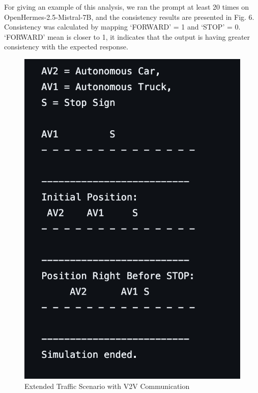 \documentclass[conference]{IEEEtran}
\begin{document}
For giving an example of this analysis, we ran the prompt at least 20 times on OpenHermes-2.5-Mistral-7B, and the consistency results are presented in Fig. 6. Consistency was calculated by mapping `FORWARD' = 1 and `STOP' = 0. `FORWARD' mean is closer to 1, it indicates that the output is having greater consistency with the expected response.

 \begin{figure}[h]
     \centering
     \includegraphics[width=.9\linewidth]{Fig/Communication_agent.png}
     \caption{Extended Traffic Scenario with V2V Communication }
     \label{fig:enter-label}
 \end{figure}
\end{document}
